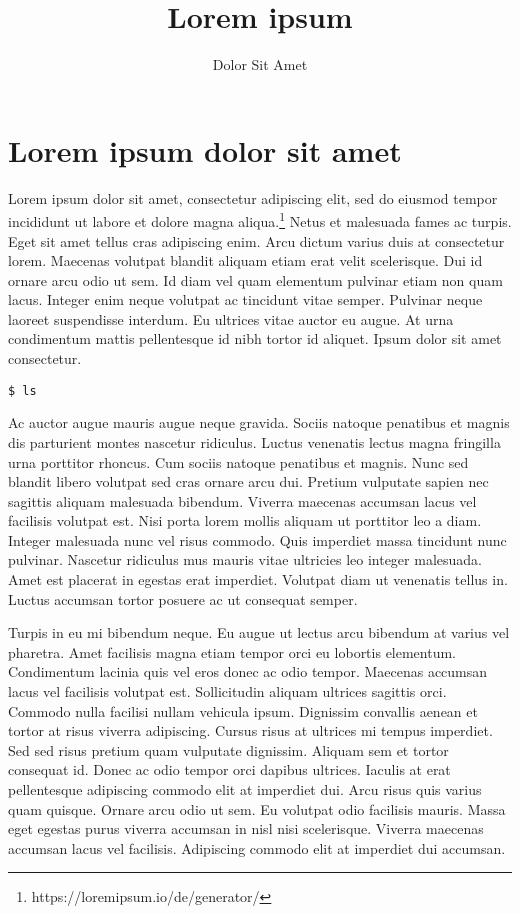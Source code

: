 \documentclass{article}
\title{Lorem ipsum}
\author{Dolor Sit Amet}
\date{\DTMnow}
\begin{document}
\maketitle

\section{Lorem ipsum dolor sit amet}

Lorem ipsum dolor sit amet, consectetur adipiscing elit, sed do eiusmod tempor incididunt ut labore et dolore magna aliqua.\footnote{https://loremipsum.io/de/generator/} Netus et malesuada fames ac turpis. Eget sit amet tellus cras adipiscing enim. Arcu dictum varius duis at consectetur lorem. Maecenas volutpat blandit aliquam etiam erat velit scelerisque. Dui id ornare arcu odio ut sem. Id diam vel quam elementum pulvinar etiam non quam lacus. Integer enim neque volutpat ac tincidunt vitae semper. Pulvinar neque laoreet suspendisse interdum. Eu ultrices vitae auctor eu augue. At urna condimentum mattis pellentesque id nibh tortor id aliquet. Ipsum dolor sit amet consectetur.

\begin{verbatim}
$ ls
\end{verbatim}

Ac auctor augue mauris augue neque gravida. Sociis natoque penatibus et magnis dis parturient montes nascetur ridiculus. Luctus venenatis lectus magna fringilla urna porttitor rhoncus. Cum sociis natoque penatibus et magnis. Nunc sed blandit libero volutpat sed cras ornare arcu dui. Pretium vulputate sapien nec sagittis aliquam malesuada bibendum. Viverra maecenas accumsan lacus vel facilisis volutpat est. Nisi porta lorem mollis aliquam ut porttitor leo a diam. Integer malesuada nunc vel risus commodo. Quis imperdiet massa tincidunt nunc pulvinar. Nascetur ridiculus mus mauris vitae ultricies leo integer malesuada. Amet est placerat in egestas erat imperdiet. Volutpat diam ut venenatis tellus in. Luctus accumsan tortor posuere ac ut consequat semper.

Turpis in eu mi bibendum neque. Eu augue ut lectus arcu bibendum at varius vel pharetra. Amet facilisis magna etiam tempor orci eu lobortis elementum. Condimentum lacinia quis vel eros donec ac odio tempor. Maecenas accumsan lacus vel facilisis volutpat est. Sollicitudin aliquam ultrices sagittis orci. Commodo nulla facilisi nullam vehicula ipsum. Dignissim convallis aenean et tortor at risus viverra adipiscing. Cursus risus at ultrices mi tempus imperdiet. Sed sed risus pretium quam vulputate dignissim. Aliquam sem et tortor consequat id. Donec ac odio tempor orci dapibus ultrices. Iaculis at erat pellentesque adipiscing commodo elit at imperdiet dui. Arcu risus quis varius quam quisque. Ornare arcu odio ut sem. Eu volutpat odio facilisis mauris. Massa eget egestas purus viverra accumsan in nisl nisi scelerisque. Viverra maecenas accumsan lacus vel facilisis. Adipiscing commodo elit at imperdiet dui accumsan.
\end{document}
